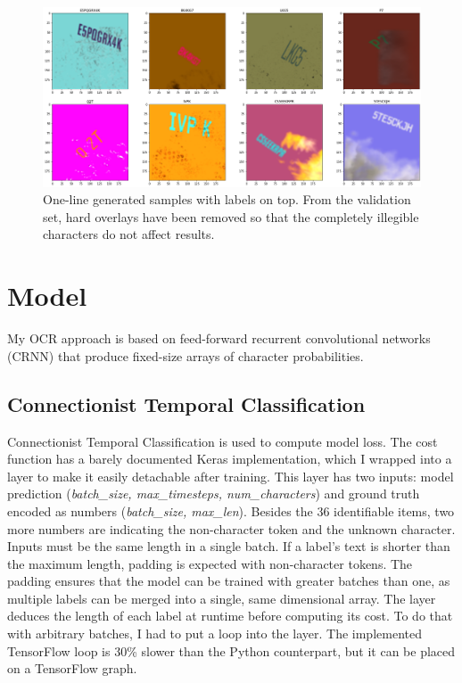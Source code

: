 \begin{figure}[htb]
 \centerline{\includegraphics[width=.85\columnwidth]{.//Figure/OCR/generated.png}}
 \caption{One-line generated samples with labels on top. From the validation set, hard overlays have been removed so that the completely illegible characters do not affect results.}
 \label{fig:simple}
\end{figure}

\section{Model}

My OCR approach is based on feed-forward recurrent convolutional networks (CRNN) that produce fixed-size arrays of character probabilities.

\subsection{Connectionist Temporal Classification}

Connectionist Temporal Classification\cite{CTC} is used to compute model loss. The cost function has a barely documented Keras implementation, which I wrapped into a layer to make it easily detachable after training. This layer has two inputs: model prediction (\textit{batch\_size, max\_timesteps, num\_characters}) and ground truth encoded as numbers (\textit{batch\_size, max\_len}). Besides the 36 identifiable items, two more numbers are indicating the non-character token and the unknown character. Inputs must be the same length in a single batch. If a label's text is shorter than the maximum length, padding is expected with non-character tokens. The padding ensures that the model can be trained with greater batches than one, as multiple labels can be merged into a single, same dimensional array. The layer deduces the length of each label at runtime before computing its cost. To do that with arbitrary batches, I had to put a loop into the layer. The implemented TensorFlow loop is 30\% slower than the Python counterpart, but it can be placed on a TensorFlow graph.

